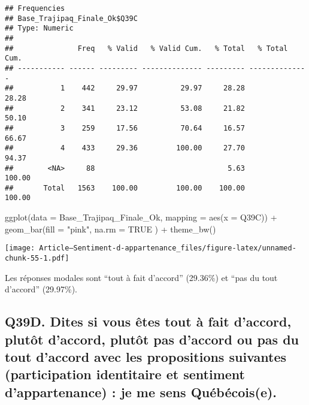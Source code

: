 \documentclass[
]{article}
\newenvironment{Shaded}{\begin{snugshade}}{\end{snugshade}}
\newcommand{\AttributeTok}[1]{\textcolor[rgb]{0.77,0.63,0.00}{#1}}
\newcommand{\ConstantTok}[1]{\textcolor[rgb]{0.00,0.00,0.00}{#1}}
\newcommand{\FunctionTok}[1]{\textcolor[rgb]{0.00,0.00,0.00}{#1}}
\newcommand{\NormalTok}[1]{#1}
\newcommand{\SpecialCharTok}[1]{\textcolor[rgb]{0.00,0.00,0.00}{#1}}
\newcommand{\StringTok}[1]{\textcolor[rgb]{0.31,0.60,0.02}{#1}}
\begin{document}
\begin{verbatim}
## Frequencies  
## Base_Trajipaq_Finale_Ok$Q39C  
## Type: Numeric  
## 
##               Freq   % Valid   % Valid Cum.   % Total   % Total Cum.
## ----------- ------ --------- -------------- --------- --------------
##           1    442     29.97          29.97     28.28          28.28
##           2    341     23.12          53.08     21.82          50.10
##           3    259     17.56          70.64     16.57          66.67
##           4    433     29.36         100.00     27.70          94.37
##        <NA>     88                               5.63         100.00
##       Total   1563    100.00         100.00    100.00         100.00
\end{verbatim}

\begin{Shaded}
\begin{Highlighting}[]
\FunctionTok{ggplot}\NormalTok{(}\AttributeTok{data =}\NormalTok{ Base\_Trajipaq\_Finale\_Ok, }\AttributeTok{mapping =} \FunctionTok{aes}\NormalTok{(}\AttributeTok{x =}\NormalTok{ Q39C)) }\SpecialCharTok{+}
  \FunctionTok{geom\_bar}\NormalTok{(}\AttributeTok{fill =} \StringTok{"pink"}\NormalTok{,}
           \AttributeTok{na.rm =} \ConstantTok{TRUE}
\NormalTok{           ) }\SpecialCharTok{+}
  \FunctionTok{theme\_bw}\NormalTok{()}
\end{Highlighting}
\end{Shaded}

\texttt{[image: Article---Sentiment-d-appartenance\_files/figure-latex/unnamed-chunk-55-1.pdf]}

Les réponses modales sont ``tout à fait d'accord'' (29.36\%) et ``pas du
tout d'accord'' (29.97\%).

\hypertarget{q39d.-dites-si-vous-uxeates-tout-uxe0-fait-daccord-plutuxf4t-daccord-plutuxf4t-pas-daccord-ou-pas-du-tout-daccord-avec-les-propositions-suivantes-participation-identitaire-et-sentiment-dappartenance-je-me-sens-quuxe9buxe9coise.}{%
\subsection{Q39D. Dites si vous êtes tout à fait d'accord, plutôt
d'accord, plutôt pas d'accord ou pas du tout d'accord avec les
propositions suivantes (participation identitaire et sentiment
d'appartenance) : je me sens
Québécois(e).}\label{q39d.-dites-si-vous-uxeates-tout-uxe0-fait-daccord-plutuxf4t-daccord-plutuxf4t-pas-daccord-ou-pas-du-tout-daccord-avec-les-propositions-suivantes-participation-identitaire-et-sentiment-dappartenance-je-me-sens-quuxe9buxe9coise.}}
\end{document}
